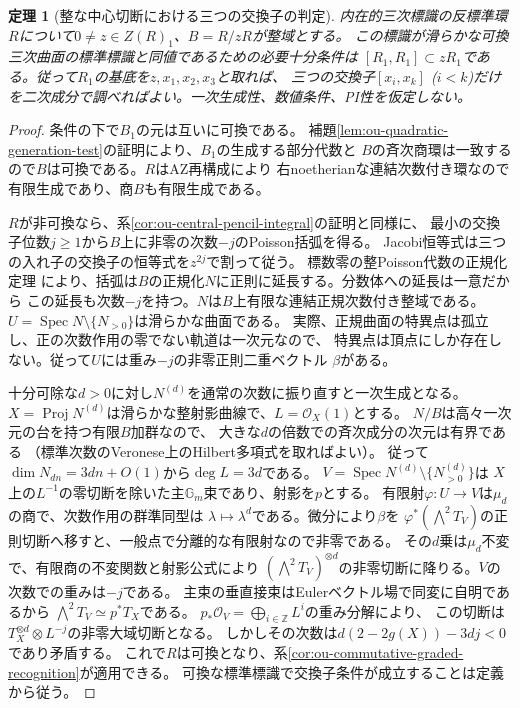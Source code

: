 \documentclass[11pt,a4paper]{ltjsarticle}
\newtheorem{theorem}{定理}[section]
\theoremstyle{definition}
\newcommand{\Proj}{\operatorname{Proj}}
\begin{document}
\begin{theorem}[整な中心切断における三つの交換子の判定]
\label{thm:ou-commuting-integral-slice}
内在的三次標識の反標準環$R$について$0\ne z\in Z(R)_1$、$B=R/zR$が整域とする。
この標識が滑らかな可換三次曲面の標準標識と同値であるための必要十分条件は
$[R_1,R_1]\subset zR_1$である。従って$R_1$の基底を$z,x_1,x_2,x_3$と取れば、
三つの交換子$[x_i,x_k]$ ($i<k$)だけを二次成分で調べればよい。一次生成性、数値条件、PI性を仮定しない。
\end{theorem}
\begin{proof}
条件の下で$B_1$の元は互いに可換である。
補題\ref{lem:ou-quadratic-generation-test}の証明により、$B_1$の生成する部分代数と
$B$の斉次商環は一致するので$B$は可換である。$R$はAZ再構成により
右noetherianな連結次数付き環なので有限生成であり、商$B$も有限生成である。

$R$が非可換なら、系\ref{cor:ou-central-pencil-integral}の証明と同様に、
最小の交換子位数$j\ge1$から$B$上に非零の次数$-j$のPoisson括弧を得る。
Jacobi恒等式は三つの入れ子の交換子の恒等式を$z^{2j}$で割って従う。
標数零の整Poisson代数の正規化定理\cite[Theorem~1.5]{KaledinPoisson2003}
により、括弧は$B$の正規化$N$に正則に延長する。分数体への延長は一意だから
この延長も次数$-j$を持つ。$N$は$B$上有限な連結正規次数付き整域である。
$U=\operatorname{Spec}N\setminus\{N_{>0}\}$は滑らかな曲面である。
実際、正規曲面の特異点は孤立し、正の次数作用の零でない軌道は一次元なので、
特異点は頂点にしか存在しない。従って$U$には重み$-j$の非零正則二重ベクトル
$\beta$がある。

十分可除な$d>0$に対し$N^{(d)}$を通常の次数に振り直すと一次生成となる。
$X=\Proj N^{(d)}$は滑らかな整射影曲線で、$L=\mathcal O_X(1)$とする。
$N/B$は高々一次元の台を持つ有限$B$加群なので、
大きな$d$の倍数での斉次成分の次元は有界である
（標準次数のVeronese上のHilbert多項式を取ればよい）。
従って$\dim N_{dn}=3dn+O(1)$から$\deg L=3d$である。
$V=\operatorname{Spec}N^{(d)}\setminus\{N^{(d)}_{>0}\}$は
$X$上の$L^{-1}$の零切断を除いた主$\mathbb G_m$束であり、射影を$p$とする。
有限射$\varphi:U\to V$は$\mu_d$の商で、次数作用の群準同型は
$\lambda\mapsto\lambda^d$である。微分により$\beta$を
$\varphi^*(\bigwedge^2T_V)$の正則切断へ移すと、一般点で分離的な有限射なので非零である。
その$d$乗は$\mu_d$不変で、有限商の不変関数と射影公式により
$(\bigwedge^2 T_V)^{\otimes d}$の非零切断に降りる。$V$の次数での重みは$-j$である。
主束の垂直接束はEulerベクトル場で同変に自明であるから
$\bigwedge^2 T_V\simeq p^*T_X$である。
$p_*\mathcal O_V=\bigoplus_{i\in\mathbb Z}L^i$の重み分解により、
この切断は$T_X^{\otimes d}\otimes L^{-j}$の非零大域切断となる。
しかしその次数は$d(2-2g(X))-3dj<0$であり矛盾する。
これで$R$は可換となり、系\ref{cor:ou-commutative-graded-recognition}が適用できる。
可換な標準標識で交換子条件が成立することは定義から従う。
\end{proof}
\end{document}

